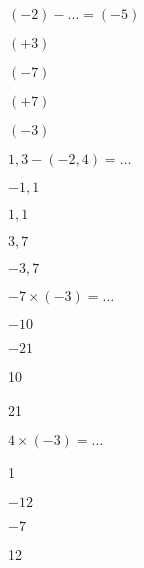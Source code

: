 \begin{QCM}
\begin{GroupeQCM}
    
    \begin{exercice}
      $(-2) - \ldots = (-5)$
      \begin{ChoixQCM}{4}
      \item $(+3)$
      \item $(-7)$
      \item $(+7)$
      \item $(-3)$
      \end{ChoixQCM}
\begin{corrige}
   \end{corrige}
    \end{exercice}
    
    
    \begin{exercice}
      $1,3 - (-2,4) = \ldots$
      \begin{ChoixQCM}{4}
      \item $-1,1$
      \item $1,1$
      \item $3,7$
      \item $-3,7$
      \end{ChoixQCM}
\begin{corrige}
   \end{corrige}
    \end{exercice}
    
    
    \begin{exercice}
      $-7 \times (-3) = \ldots$
      \begin{ChoixQCM}{4}
      \item $-10$
      \item $-21$
      \item 10
      \item 21
      \end{ChoixQCM}
\begin{corrige}
   \end{corrige}
    \end{exercice}
    
    
    \begin{exercice}
      $4 \times (-3) = \ldots$
      \begin{ChoixQCM}{4}
      \item 1
      \item $-12$
      \item $-7$
      \item 12
      \end{ChoixQCM}
\begin{corrige}
   \end{corrige}
    \end{exercice}
    

\end{GroupeQCM}
\end{QCM}
